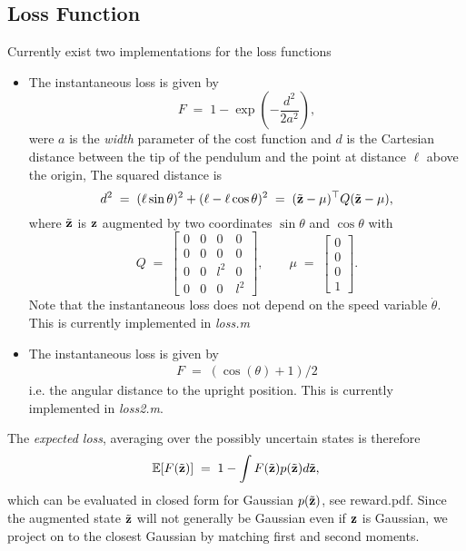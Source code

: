 \documentclass{article}
\newcommand{\bfz}{{\bf z}}
\newcommand{\E}{{\mathbb E}}
\begin{document}
\subsection*{Loss Function}
Currently exist two implementations for the loss functions
\begin{itemize}
\item The instantaneous loss is given by
\[
F\;=\;1-\exp(-\frac{d^2}{2a^2}),
\]
were  $a$ is the \emph{width} parameter of the cost function and $d$ is  the Cartesian distance between the tip of the pendulum and the point at distance $\ell$ above the origin,
	   The squared distance is
	\[
	d^2\;=\;(\ell\sin\theta)^2+(\ell-\ell\cos\theta)^2
	\;=\;(\tilde\bfz-\mu)^\top Q(\tilde\bfz-\mu),
	\]
	where $\tilde\bfz$ is $\bfz$ augmented by two coordinates $\sin\theta$ and $\cos\theta$  with 
		\[
	Q\;=\;\begin{bmatrix}0&0&0&0 \\ 0&0&0&0 \\ 0&0&l^2&0 \\ 0&0&0&l^2 \end{bmatrix},\qquad
	\mu\;=\;\begin{bmatrix} 0 \\ 0 \\ 0 \\ 1 \end{bmatrix}.
	\]
	Note that the instantaneous loss does not depend on the speed variable $\dot\theta$.
	This is currently implemented in \textit{loss.m}	
	\item The instantaneous loss is given by
	\begin{align*}
	F\;=\; (\cos (\theta) +1)/2
	\end{align*}		
	i.e. the angular distance to the upright position. This is currently implemented in \textit{loss2.m}.
\end{itemize}
The \emph{expected loss}, averaging over the possibly uncertain states
is therefore
\[
\E[F(\tilde\bfz)]\;=\;1-\int F(\tilde\bfz)p(\tilde\bfz)d\tilde\bfz,
\]
which can be evaluated in closed form for Gaussian $p(\tilde\bfz)$, see
reward.pdf. Since the augmented state $\tilde\bfz$ will not generally
be Gaussian even if $\bfz$ is Gaussian, we project on to the closest
Gaussian by matching first and second moments.
\end{document}
